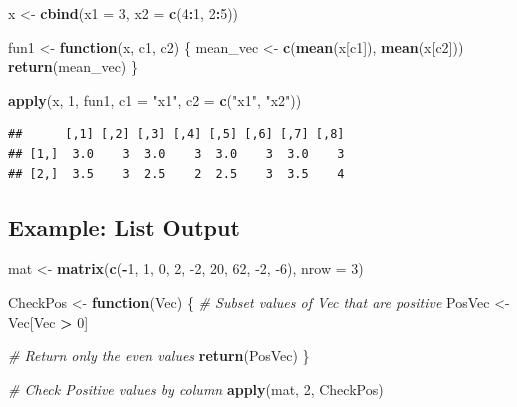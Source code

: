 \documentclass[
]{book}
\newenvironment{Shaded}{\begin{snugshade}}{\end{snugshade}}
\newcommand{\CommentTok}[1]{\textcolor[rgb]{0.56,0.35,0.01}{\textit{#1}}}
\newcommand{\ControlFlowTok}[1]{\textcolor[rgb]{0.13,0.29,0.53}{\textbf{#1}}}
\newcommand{\DataTypeTok}[1]{\textcolor[rgb]{0.13,0.29,0.53}{#1}}
\newcommand{\DecValTok}[1]{\textcolor[rgb]{0.00,0.00,0.81}{#1}}
\newcommand{\KeywordTok}[1]{\textcolor[rgb]{0.13,0.29,0.53}{\textbf{#1}}}
\newcommand{\NormalTok}[1]{#1}
\newcommand{\OperatorTok}[1]{\textcolor[rgb]{0.81,0.36,0.00}{\textbf{#1}}}
\newcommand{\StringTok}[1]{\textcolor[rgb]{0.31,0.60,0.02}{#1}}
\begin{document}
\begin{Shaded}
\begin{Highlighting}[]
\NormalTok{x <-}\StringTok{ }\KeywordTok{cbind}\NormalTok{(}\DataTypeTok{x1 =} \DecValTok{3}\NormalTok{, }\DataTypeTok{x2 =} \KeywordTok{c}\NormalTok{(}\DecValTok{4}\OperatorTok{:}\DecValTok{1}\NormalTok{, }\DecValTok{2}\OperatorTok{:}\DecValTok{5}\NormalTok{))}

\NormalTok{fun1 <-}\StringTok{ }\ControlFlowTok{function}\NormalTok{(x, c1, c2) \{}
\NormalTok{    mean_vec <-}\StringTok{ }\KeywordTok{c}\NormalTok{(}\KeywordTok{mean}\NormalTok{(x[c1]), }\KeywordTok{mean}\NormalTok{(x[c2]))}
    \KeywordTok{return}\NormalTok{(mean_vec)}
\NormalTok{\}}

\KeywordTok{apply}\NormalTok{(x, }\DecValTok{1}\NormalTok{, fun1, }\DataTypeTok{c1 =} \StringTok{"x1"}\NormalTok{, }\DataTypeTok{c2 =} \KeywordTok{c}\NormalTok{(}\StringTok{"x1"}\NormalTok{, }\StringTok{"x2"}\NormalTok{))}
\end{Highlighting}
\end{Shaded}

\begin{verbatim}
##      [,1] [,2] [,3] [,4] [,5] [,6] [,7] [,8]
## [1,]  3.0    3  3.0    3  3.0    3  3.0    3
## [2,]  3.5    3  2.5    2  2.5    3  3.5    4
\end{verbatim}

\hypertarget{example-list-output}{%
\subsection{Example: List Output}\label{example-list-output}}

\begin{Shaded}
\begin{Highlighting}[]
\NormalTok{mat <-}\StringTok{ }\KeywordTok{matrix}\NormalTok{(}\KeywordTok{c}\NormalTok{(}\OperatorTok{-}\DecValTok{1}\NormalTok{, }\DecValTok{1}\NormalTok{, }\DecValTok{0}\NormalTok{, }\DecValTok{2}\NormalTok{, }\DecValTok{-2}\NormalTok{, }\DecValTok{20}\NormalTok{, }\DecValTok{62}\NormalTok{, }\DecValTok{-2}\NormalTok{, }\DecValTok{-6}\NormalTok{), }\DataTypeTok{nrow =} \DecValTok{3}\NormalTok{)}

\NormalTok{CheckPos <-}\StringTok{ }\ControlFlowTok{function}\NormalTok{(Vec) \{}
    \CommentTok{# Subset values of Vec that are positive}
\NormalTok{    PosVec <-}\StringTok{ }\NormalTok{Vec[Vec }\OperatorTok{>}\StringTok{ }\DecValTok{0}\NormalTok{]}

    \CommentTok{# Return only the even values}
    \KeywordTok{return}\NormalTok{(PosVec)}
\NormalTok{\}}

\CommentTok{# Check Positive values by column}
\KeywordTok{apply}\NormalTok{(mat, }\DecValTok{2}\NormalTok{, CheckPos)}
\end{Highlighting}
\end{Shaded}
\end{document}
